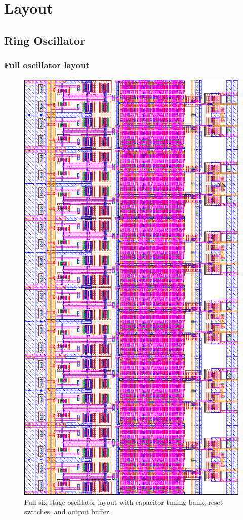 	\appendix

	\section{Layout}
		\subsection{Ring Oscillator}\label{sec:lay_osc}
			\subsubsection{Full oscillator layout}
				\begin{figure}[htb!]
				        \centering
				        \includegraphics[height=0.75\textheight, angle=0]{./figs/layout/layout_osc}
				    \caption{Full six stage oscillator layout with capacitor tuning bank, reset switches, and output buffer.}
				\end{figure}
			\FloatBarrier\pagebreak
